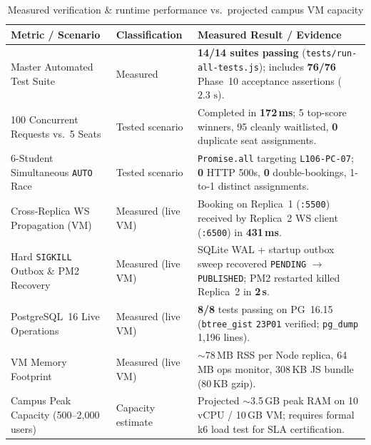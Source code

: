 \documentclass[manuscript,screen,review]{acmart}
\begin{document}
\begin{table}[htbp]
  \caption{Measured verification \& runtime performance vs.\ projected campus VM capacity}
  \label{tab:performance}
  \small
  \begin{tabularx}{\columnwidth}{@{}p{}p{}L@{}}
    \toprule
    \textbf{Metric / Scenario} & \textbf{Classification} & \textbf{Measured Result / Evidence} \\
    \midrule
    Master Automated Test Suite & Measured & \textbf{14/14 suites passing} (\texttt{tests/run-all-tests.js}); includes \textbf{76/76} Phase~10 acceptance assertions ($2.3\text{ s}$). \\
    100 Concurrent Requests vs.\ 5 Seats & Tested scenario & Completed in \textbf{172\,ms}; 5 top-score winners, 95 cleanly waitlisted, \textbf{0} duplicate seat assignments. \\
    6-Student Simultaneous \texttt{AUTO} Race & Tested scenario & \texttt{Promise.all} targeting \texttt{L106-PC-07}; \textbf{0} HTTP 500s, \textbf{0} double-bookings, 1-to-1 distinct assignments. \\
    Cross-Replica WS Propagation (VM) & Measured (live VM) & Booking on Replica~1 (\texttt{:5500}) received by Replica~2 WS client (\texttt{:6500}) in \textbf{431\,ms}. \\
    Hard \texttt{SIGKILL} Outbox \& PM2 Recovery & Measured (live VM) & SQLite WAL + startup outbox sweep recovered \texttt{PENDING} $\rightarrow$ \texttt{PUBLISHED}; PM2 restarted killed Replica~2 in \textbf{2\,s}. \\
    PostgreSQL~16 Live Operations & Measured (live VM) & \textbf{8/8} tests passing on PG~16.15 (\texttt{btree\_gist} \texttt{23P01} verified; \texttt{pg\_dump} 1,196 lines). \\
    VM Memory Footprint & Measured (live VM) & $\sim$78\,MB RSS per Node replica, 64\,MB ops monitor, 308\,KB JS bundle (80\,KB gzip). \\
    Campus Peak Capacity (500--2,000 users) & Capacity estimate & Projected $\sim$3.5\,GB peak RAM on 10\,vCPU / 10\,GB VM; requires formal k6 load test for SLA certification. \\
    \bottomrule
  \end{tabularx}
\end{table}

\end{document}
